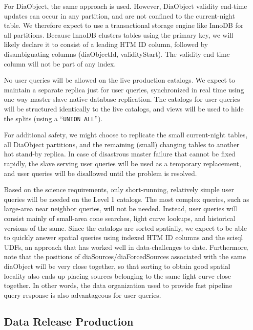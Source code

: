 \documentclass[DM,lsstdraft,toc]{lsstdoc}
\begin{document}
For DiaObject, the same approach is used. However, DiaObject validity
end-time updates can occur in any partition, and are not confined to the
current-night table. We therefore expect to use a transactional storage
engine like InnoDB for all partitions. Because InnoDB clusters tables
using the primary key, we will likely declare it to consist of a leading
HTM ID column, followed by disambiguating columns (diaObjectId,
validityStart). The validity end time column will not be part of any
index.

No user queries will be allowed on the live production catalogs. We
expect to maintain a separate replica just for user queries,
synchronized in real time using one-way master-slave native database
replication. The catalogs for user queries will be structured
identically to the live catalogs, and views will be used to hide the
splits (using a ``\texttt{UNION\ ALL}'').

For additional safety, we might choose to replicate the small
current-night tables, all DiaObject partitions, and the remaining
(small) changing tables to another hot stand-by replica. In case of
disastrous master failure that cannot be fixed rapidly, the slave
serving user queries will be used as a temporary replacement, and user
queries will be disallowed until the problem is resolved.

Based on the science requirements, only short-running, relatively simple
user queries will be needed on the Level 1 catalogs. The most complex
queries, such as large-area near neighbor queries, will not be needed.
Instead, user queries will consist mainly of small-area cone searches,
light curve lookups, and historical versions of the same. Since the
catalogs are sorted spatially, we expect to be able to quickly answer
spatial queries using indexed HTM ID columns and the scisql UDFs, an
approach that has worked well in data-challenges to date. Furthermore,
note that the positions of diaSources/diaForcedSources associated with
the same diaObject will be very close together, so that sorting to
obtain good spatial locality also ends up placing sources belonging to
the same light curve close together. In other words, the data
organization used to provide fast pipeline query response is also
advantageous for user queries.

\subsection{Data Release Production}\label{data-release-production}
\end{document}

